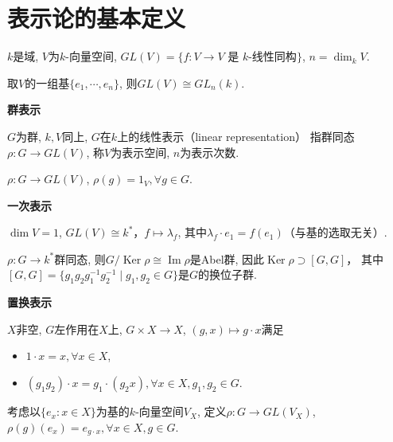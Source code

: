 \newtheorem{exercise}{练习}
\newcommand{\tr}{\operatorname{tr}}
\newcommand{\Hom}{\operatorname{Hom}}
\newcommand{\Ker}{\operatorname{Ker}}
\renewcommand{\Im}{\operatorname{Im}}
\newcommand{\End}{\operatorname{End}}
\newcommand{\Gal}{\operatorname{Gal}}
\nosectionnumbers
\section{表示论的基本定义}
\begin{definition}
    $k$是域, $V$为$k$-向量空间, 
    $GL(V)=\{f:V\rightarrow V\text{ 是 }k\text{-线性同构}\}$, $n=\dim_k V$.\par
    \qquad 取$V$的一组基$\{e_1,\cdots,e_n\}$, 则$GL(V)\cong GL_n(k)$.
\end{definition}

\begin{definition} \textbf{群表示}\par
    \qquad $G$为群, $k,V$同上, $G$在$k$上的线性表示（linear representation）
    指群同态$\rho:G\rightarrow GL(V)$, 称$V$为表示空间, $n$为表示次数.
\end{definition}

\begin{example} 
    \qquad $\rho:G\rightarrow GL(V)$, $\rho(g)=1_V, \forall g\in G$.
\end{example}

\begin{example} \textbf{一次表示}\par
    \qquad $\dim V=1$, $GL(V)\cong k^*$，$f\mapsto \lambda_f$, 
    其中$\lambda_f\cdot e_1=f(e_1)$（与基的选取无关）.\par
    \qquad $\rho:G\rightarrow k^*$群同态, 
    则$G/\Ker\rho \cong \Im\rho$是Abel群, 因此$\Ker\rho \supset [G,G]$，
    其中$[G,G]=\{g_1g_2g_1^{-1}g_2^{-1}\mid g_1,g_2\in G\}$是$G$的换位子群.
\end{example}

\begin{example} \textbf{置换表示}\par
    \qquad $X$非空, $G$左作用在$X$上, $G\times X\rightarrow X$, 
    $(g,x)\mapsto g\cdot x$满足
    \begin{itemize}\item[$\circ$] $1\cdot x=x, \forall x\in X$,\\
    \item[$\circ$] $(g_1g_2)\cdot x=g_1\cdot (g_2x), \forall x\in X, g_1, g_2\in G$.\end{itemize}
    \qquad 考虑以$\{e_x:x\in X\}$为基的$k$-向量空间$V_X$, 
    定义$\rho:G\rightarrow GL(V_X)$, 
    $\rho(g)(e_x)=e_{g\cdot x}, \forall x\in X, g\in G$.
\end{example}

